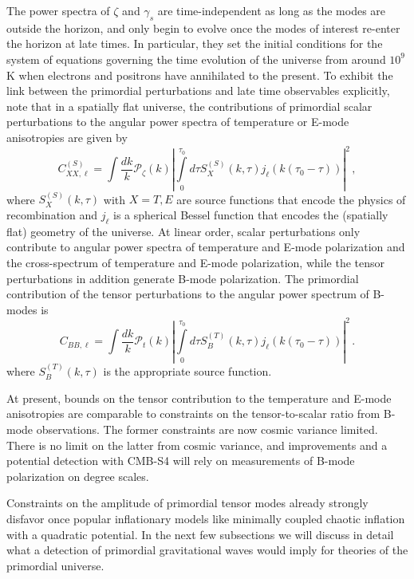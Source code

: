 The power spectra of $\zeta$ and $\gamma_s$ are time-independent as long as the modes are outside the horizon, and only begin to evolve once the modes of interest re-enter the horizon at late times. In particular, they set the initial conditions for the system of equations governing the time evolution of the universe from around $10^9$ K when electrons and positrons have annihilated to the present. To exhibit the link between the primordial perturbations and late time observables explicitly, note that in a spatially flat universe, the contributions of primordial scalar perturbations to the angular power spectra of temperature or E-mode anisotropies are given by
\begin{equation}
C^{(S)}_{XX,\ell}=\int \frac{dk}{k}\mathcal{P}_\zeta(k)\left|\int\limits_0^{\tau_0} d\tau S_X^{(S)}(k,\tau)j_\ell(k(\tau_0-\tau))\right|^2\,,
\end{equation}
where $S_X^{(S)}(k,\tau)$ with $X=T,E$ are source functions that encode the physics of recombination and $j_\ell$ is a spherical Bessel function that encodes the (spatially flat) geometry of the universe.
At linear order, scalar perturbations only contribute to angular power spectra of temperature and E-mode polarization and the cross-spectrum of temperature and E-mode polarization, while the tensor perturbations in addition generate B-mode polarization. The primordial contribution of the tensor perturbations to the angular power spectrum of B-modes is 
\begin{equation}
C_{BB,\ell}=\int \frac{dk}{k}\mathcal{P}_t(k)\left|\int\limits_0^{\tau_0} d\tau S_B^{(T)}(k,\tau)j_\ell(k(\tau_0-\tau))\right|^2\,.
\end{equation}
where $S_B^{(T)}(k,\tau)$ is the appropriate source function. 

At present, bounds on the tensor contribution to the temperature and E-mode anisotropies are comparable to constraints on the tensor-to-scalar ratio from B-mode observations. The former constraints are now cosmic variance limited. There is no limit on the latter from cosmic variance, and improvements and a potential detection with CMB-S4 will rely on measurements of B-mode polarization on degree scales.

Constraints on the amplitude of primordial tensor modes already strongly disfavor once popular inflationary models like minimally coupled chaotic inflation with a quadratic potential. In the next few subsections we will discuss in detail what a detection of primordial gravitational waves would imply for theories of the primordial universe. 

